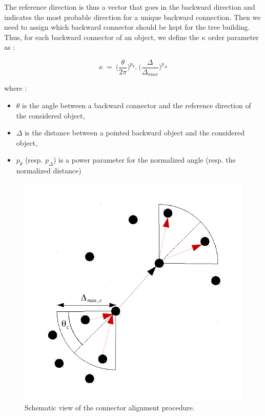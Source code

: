 \documentclass[cits]{JINST}
\begin{document}
The reference direction is thus a vector that goes in the backward direction and indicates the most probable direction for a unique backward connection. Then we need to assign which backward connector should be kept for the tree building. Thus, for each backward connector of an object, we define the $\kappa$ order parameter as :

\begin{equation}
  \kappa~=~\Big(\frac{\theta}{2\pi}\Big)^{p_{\theta}} . ~\Big(\frac{\Delta}{\Delta_{max}}\Big)^{p_{\Delta}} 
\end{equation}

where :

\begin{itemize}
  \item $\theta$ is the angle between a backward connector and the reference direction of the considered object,
  \item $\Delta$ is the distance between a pointed backward object and the considered object,
  \item $p_{\theta}$ (resp. $p_{\Delta}$) is a power parameter for the normalized angle (resp. the normalized distance)
\end{itemize}

\begin{figure}
  \vspace{-30pt}
  \begin{center}
    \includegraphics[width=\linewidth]{ConnectorAlignment.pdf}
  \end{center}
  \vspace{-10pt}
  \caption{\label{ARBOR_CONNECTOR_ALIGNEMENT} Schematic view of the connector alignment procedure.}
  \vspace{25pt}
\end{figure}
\end{document}
